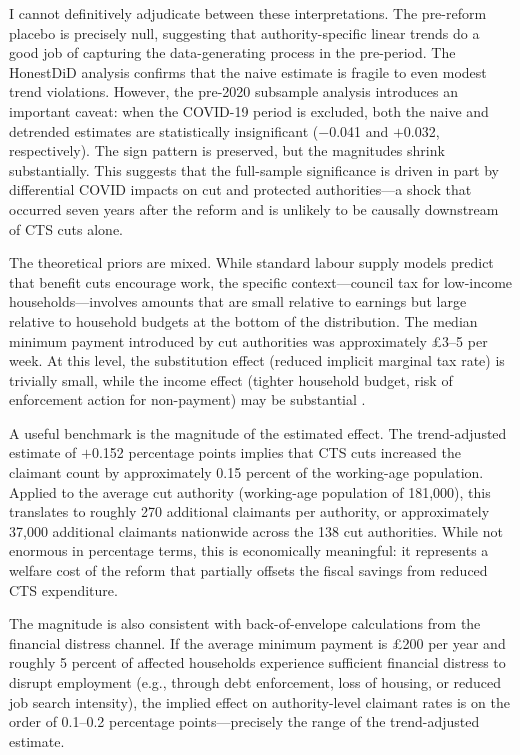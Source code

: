 \documentclass[12pt]{article}
\begin{document}
I cannot definitively adjudicate between these interpretations. The pre-reform placebo is precisely null, suggesting that authority-specific linear trends do a good job of capturing the data-generating process in the pre-period. The HonestDiD analysis confirms that the naive estimate is fragile to even modest trend violations. However, the pre-2020 subsample analysis introduces an important caveat: when the COVID-19 period is excluded, both the naive and detrended estimates are statistically insignificant ($-$0.041 and $+$0.032, respectively). The sign pattern is preserved, but the magnitudes shrink substantially. This suggests that the full-sample significance is driven in part by differential COVID impacts on cut and protected authorities---a shock that occurred seven years after the reform and is unlikely to be causally downstream of CTS cuts alone.

The theoretical priors are mixed. While standard labour supply models predict that benefit cuts encourage work, the specific context---council tax for low-income households---involves amounts that are small relative to earnings but large relative to household budgets at the bottom of the distribution. The median minimum payment introduced by cut authorities was approximately \pounds 3--5 per week. At this level, the substitution effect (reduced implicit marginal tax rate) is trivially small, while the income effect (tighter household budget, risk of enforcement action for non-payment) may be substantial \citep{jrf2015council}.

A useful benchmark is the magnitude of the estimated effect. The trend-adjusted estimate of $+$0.152 percentage points implies that CTS cuts increased the claimant count by approximately 0.15 percent of the working-age population. Applied to the average cut authority (working-age population of 181,000), this translates to roughly 270 additional claimants per authority, or approximately 37,000 additional claimants nationwide across the 138 cut authorities. While not enormous in percentage terms, this is economically meaningful: it represents a welfare cost of the reform that partially offsets the fiscal savings from reduced CTS expenditure.

The magnitude is also consistent with back-of-envelope calculations from the financial distress channel. If the average minimum payment is \pounds 200 per year and roughly 5 percent of affected households experience sufficient financial distress to disrupt employment (e.g., through debt enforcement, loss of housing, or reduced job search intensity), the implied effect on authority-level claimant rates is on the order of 0.1--0.2 percentage points---precisely the range of the trend-adjusted estimate.
\end{document}
